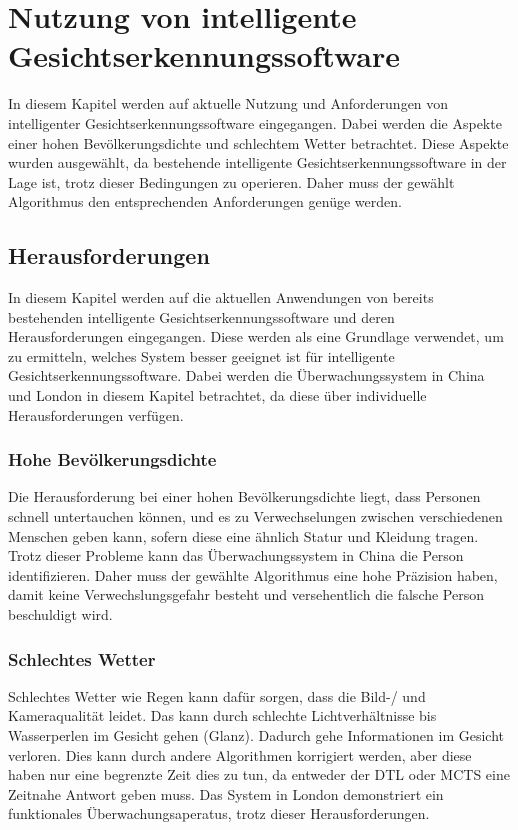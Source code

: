 %
%
\chapter{Nutzung von intelligente Gesichtserkennungssoftware}
\label{sec:background:first_section}
In diesem Kapitel werden auf aktuelle Nutzung und Anforderungen von intelligenter Gesichtserkennungssoftware eingegangen.
Dabei werden die Aspekte einer hohen Bevölkerungsdichte und schlechtem Wetter betrachtet.
Diese Aspekte wurden ausgewählt, da bestehende intelligente Gesichtserkennungssoftware in der Lage ist, trotz dieser Bedingungen zu operieren. \cite{Stumm2022}
Daher muss der gewählt Algorithmus den entsprechenden Anforderungen genüge werden.

\section{Herausforderungen}
\label{sec:background:first_section:first_section}
In diesem Kapitel werden auf die aktuellen Anwendungen von bereits bestehenden intelligente Gesichtserkennungssoftware und deren Herausforderungen eingegangen.
Diese werden als eine Grundlage verwendet, um zu ermitteln, welches System besser geeignet ist für intelligente Gesichtserkennungssoftware.
Dabei werden die Überwachungssystem in China und London in diesem Kapitel betrachtet, da diese über individuelle Herausforderungen verfügen. \cite{Stumm2022} 

\subsection{Hohe Bevölkerungsdichte}
\label{subsec:background:first_section:first_subsection}
Die Herausforderung bei einer hohen Bevölkerungsdichte liegt, dass Personen schnell untertauchen können, und es zu Verwechselungen zwischen verschiedenen Menschen geben kann, sofern diese eine ähnlich Statur und Kleidung tragen. 
Trotz dieser Probleme kann das Überwachungssystem in China die Person identifizieren. \cite{Stumm2022}
Daher muss der gewählte Algorithmus eine hohe Präzision haben, damit keine Verwechslungsgefahr besteht und versehentlich die falsche Person beschuldigt wird.

\subsection{Schlechtes Wetter}
\label{subsec:background:first_section:second_subsection}
Schlechtes Wetter wie Regen kann dafür sorgen, dass die Bild-/ und Kameraqualität leidet.
Das kann durch schlechte Lichtverhältnisse bis Wasserperlen im Gesicht gehen (Glanz).
Dadurch gehe Informationen im Gesicht verloren.
Dies kann durch andere Algorithmen korrigiert werden, aber diese haben nur eine begrenzte Zeit dies zu tun, da entweder der \ac{DTL} oder \ac{MCTS} eine Zeitnahe Antwort geben muss.
Das System in London demonstriert ein funktionales Überwachungsaperatus, trotz dieser Herausforderungen. \cite{Stumm2022}
%
%
